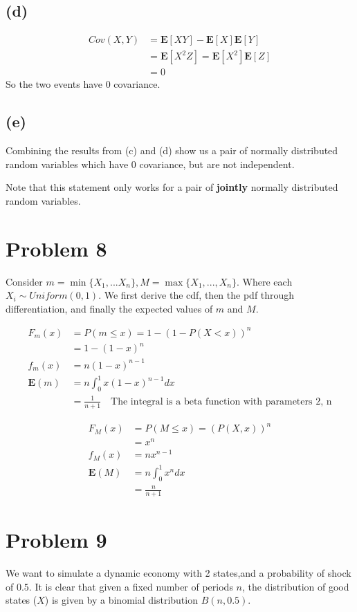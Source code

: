 \documentclass{article}
\begin{document}
	\subsection*{(d)}
	\begin{align*}
	Cov(X,Y) &= \mathbf{E}[XY] - \mathbf{E}[X] \mathbf{E}[Y] \\
	&= \mathbf{E}[X^2 Z]  = \mathbf{E}[X^2] \mathbf{E}[Z] \\
	&= 0
	\end{align*} 
	So the two events have 0 covariance.
	
	\subsection*{(e)}
	Combining the results from (c) and (d) show us a pair of normally distributed random variables which have 0 covariance, but are not independent.
	
	Note that this statement only works for a pair of \textbf{jointly} normally distributed random variables.
	
	\section*{Problem 8}
	Consider $m = \min \{ X_1, ... X_n \}, M = \max \{ X_1,...,X_n\}$. Where each $X_i \sim Uniform(0,1)$. We first derive the cdf, then the pdf through differentiation, and finally the expected values of $m$ and $M$.
	
	\begin{align*}
	F_m(x) &= P(m \leq x) = 1 - (1- P(X < x))^n \\
	&= 1 - (1- x)^n\\
	f_m(x) &= n(1 - x)^{n-1}	\\
	\mathbf{E}(m) &= n \int_{0}^{1} x(1-x)^{n-1} dx \\
	&= \frac{1}{n+1} \quad \text{The integral is a beta function with parameters 2, n}
	\end{align*}
	
	\begin{align*}
	F_M(x) &= P(M \leq x) = (P(X, x))^n \\
	&= x^n \\
	f_M(x) &= nx^{n-1} \\
	\mathbf{E}(M) &= n \int_{0}^{1} x^{n} dx \\
	&= \frac{n}{n+1}
	\end{align*}
	
	\section*{Problem 9}
	We want to simulate a dynamic economy with 2 states,and a probability of shock of $0.5$. It is clear that given a fixed number of periods $n$, the distribution of good states ($X$) is given by a binomial distribution $B(n,0.5)$.  
	
\end{document}
